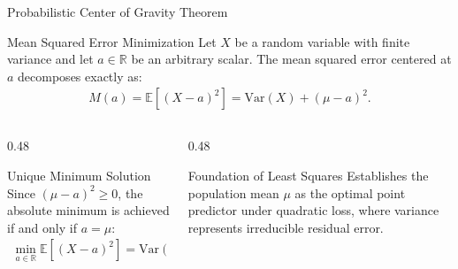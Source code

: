 \documentclass[aspectratio=169,xcolor={dvipsnames,table}]{beamer}
\begin{document}
\begin{frame}{Probabilistic Center of Gravity Theorem}
	\begin{block}{Mean Squared Error Minimization}
		\small
		Let $X$ be a random variable with finite variance and let $a \in \mathbb{R}$ be an arbitrary scalar. The mean squared error centered at $a$ decomposes exactly as:
		\begin{align*}
			M(a) = \mathbb{E}\left[ (X - a)^2 \right] = \text{Var}(X) + (\mu - a)^2.
		\end{align*}
	\end{block}
	\vspace{-0.15cm}
	\begin{columns}[T]
		\begin{column}{0.48\textwidth}
			\begin{exampleblock}{Unique Minimum Solution}
				\footnotesize
				Since $(\mu - a)^2 \ge 0$, the absolute minimum is achieved if and only if $a = \mu$:
				\begin{align*}
					\min_{a \in \mathbb{R}} \mathbb{E}\left[ (X - a)^2 \right] = \text{Var}(X).
				\end{align*}
			\end{exampleblock}
		\end{column}
		\begin{column}{0.48\textwidth}
			\begin{alertblock}{Foundation of Least Squares}
				\footnotesize
				Establishes the population mean $\mu$ as the optimal point predictor under quadratic loss, where variance represents irreducible residual error.
			\end{alertblock}
		\end{column}
	\end{columns}
\end{frame}
\end{document}
